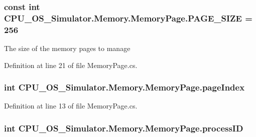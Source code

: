 \subsubsection[{P\+A\+G\+E\+\_\+\+S\+I\+Z\+E}]{\setlength{\rightskip}{0pt plus 5cm}const int C\+P\+U\+\_\+\+O\+S\+\_\+\+Simulator.\+Memory.\+Memory\+Page.\+P\+A\+G\+E\+\_\+\+S\+I\+Z\+E = 256}\label{class_c_p_u___o_s___simulator_1_1_memory_1_1_memory_page_a502abee83030136a808d5b5f0c0fe7ec}


The size of the memory pages to manage 



Definition at line 21 of file Memory\+Page.\+cs.

\hypertarget{class_c_p_u___o_s___simulator_1_1_memory_1_1_memory_page_acf60a7bdefab6120fe080854b5f0b38b}{}
\subsubsection[{page\+Index}]{\setlength{\rightskip}{0pt plus 5cm}int C\+P\+U\+\_\+\+O\+S\+\_\+\+Simulator.\+Memory.\+Memory\+Page.\+page\+Index\hspace{0.3cm}{\ttfamily [private]}}\label{class_c_p_u___o_s___simulator_1_1_memory_1_1_memory_page_acf60a7bdefab6120fe080854b5f0b38b}


Definition at line 13 of file Memory\+Page.\+cs.

\hypertarget{class_c_p_u___o_s___simulator_1_1_memory_1_1_memory_page_a9fbfaef488c3267b6db79d40e6ae521b}{}
\subsubsection[{process\+I\+D}]{\setlength{\rightskip}{0pt plus 5cm}int C\+P\+U\+\_\+\+O\+S\+\_\+\+Simulator.\+Memory.\+Memory\+Page.\+process\+I\+D\hspace{0.3cm}{\ttfamily [private]}}\label{class_c_p_u___o_s___simulator_1_1_memory_1_1_memory_page_a9fbfaef488c3267b6db79d40e6ae521b}


